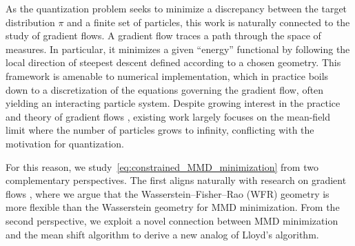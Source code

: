 As the quantization problem seeks to minimize a discrepancy between the target distribution $\pi$ and a finite set of particles, this work is naturally connected to the study of gradient flows. 
A gradient flow traces a path through the space of measures. In particular, it minimizes a given ``energy'' functional by following the local direction of steepest descent defined according to a chosen geometry.
This framework is amenable to numerical implementation, which in practice boils down to a discretization of the equations governing the gradient flow, often yielding an interacting particle system. Despite growing interest in the practice and theory of gradient flows \cite{JoKiOt98,Ott01,KoMoVo16,CrBe16,San17,GaMo17,CaCrPa19,ArKoSaGr19,ChGoLuMaRi20,SaKoLu20,GlArGr21,KoAuMaAb21,LuSlWa23,MaMa24,ChNiRi24,ZhMi24}, existing work largely focuses on the mean-field limit where the number of particles grows to infinity, conflicting with the motivation for quantization.

For this reason, we study~\eqref{eq:constrained_MMD_minimization} from two complementary perspectives. The first aligns naturally with  research on gradient flows \cite{ArKoSaGr19,GlDvMiZh24}, where we argue that the Wasserstein--Fisher--Rao (WFR) geometry is more flexible than the Wasserstein geometry for MMD minimization. From the second perspective, we exploit a novel connection between MMD minimization and the mean shift algorithm to derive a new analog of Lloyd's algorithm. 
















